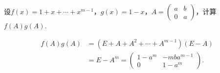 \begin{exercise}
\begin{exgroup}
\begin{answer}
\begin{enumerate}
            \end{enumerate}
        \end{answer}
    \end{exgroup}

    \begin{exgroup}
        \item 设$f(x)=1+x+\cdots+x^{m-1}$，$g(x)=1-x$，$A=\begin{pmatrix}
                a & b \\ 0 & a
            \end{pmatrix}$，计算$f(A)g(A)$.
        \begin{answer}
            \begin{align*}
                f(A) g(A) & = (E + A + A^2 + \cdots + A^{m - 1})(E - A) \\
                          & = E - A^m = \begin{pmatrix}
                                            1 - a^m & -mba^{m - 1} \\
                                            0       & 1 - a^m
                                        \end{pmatrix}.
            \end{align*}
        \end{answer}


\end{exgroup}
\end{exercise}

